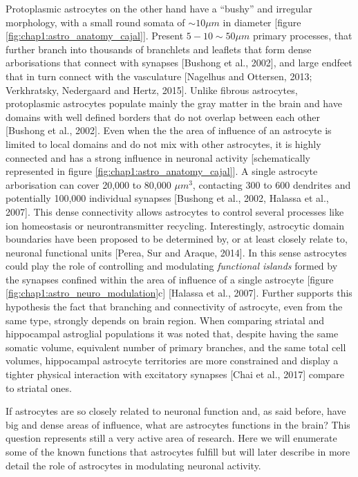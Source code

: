 Protoplasmic astrocytes on the other hand have a “bushy” and irregular morphology, with a small round somata of $\sim 10 \mu m$ in diameter [figure \ref{fig:chap1:astro_anatomy_cajal}]. 
Present $5-10 \sim 50 \mu m$ primary processes, that further branch into thousands of branchlets and leaflets that form dense arborisations that connect with synapses [Bushong et al., 2002], and large endfeet that in turn connect with the vasculature [Nagelhus and Ottersen, 2013; Verkhratsky, Nedergaard and Hertz, 2015].
Unlike fibrous astrocytes, protoplasmic astrocytes populate mainly the gray matter in the brain and have domains with well defined borders that do not overlap between each other [Bushong et al., 2002].
Even when the the area of influence of an astrocyte is limited to local domains and do not mix with other astrocytes, it is highly connected and has a strong influence in neuronal activity [schematically represented in figure \ref{fig:chap1:astro_anatomy_cajal}].  
A single astrocyte arborisation can cover 20,000 to 80,000 $\mu m^3$, contacting 300 to 600 dendrites and potentially 100,000 individual synapses [Bushong et al., 2002, Halassa et al., 2007].
This dense connectivity allows astrocytes to control several processes like ion homeostasis or neurontransmitter recycling.
Interestingly, astrocytic domain boundaries have been proposed to be determined by, or at least closely relate to, neuronal functional units [Perea, Sur and Araque, 2014].
In this sense astrocytes could play the role of controlling and modulating \textit{functional islands} formed by the synapses confined within the area of influence of a single astrocyte [figure \ref{fig:chap1:astro_neuro_modulation}c] [Halassa et al., 2007].
Further supports this hypothesis the fact that branching and connectivity of astrocyte, even from the same type, strongly depends on brain region.  
When comparing striatal and hippocampal astroglial populations it was noted that, despite having the same somatic volume, equivalent number of primary branches, and the same total cell volumes, hippocampal astrocyte territories are more constrained and display a tighter physical interaction with excitatory synapses [Chai et al., 2017] compare to striatal ones.

If astrocytes are so closely related to neuronal function and, as said before, have big and dense areas of influence, what are astrocytes functions in the brain? 
This question represents still a very active area of research. Here we will enumerate some of the known functions that astrocytes fulfill but will later describe in more detail the role of astrocytes in modulating neuronal activity. 

